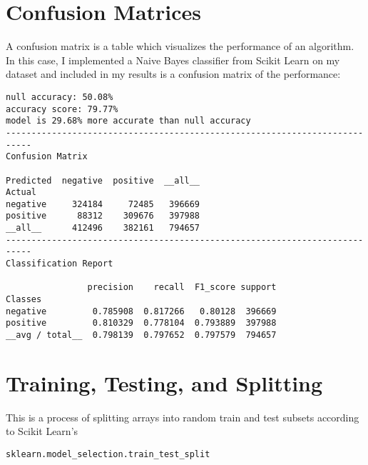 \documentclass[11pt, twoside, reqno]{book}
\begin{document}
\section{Confusion Matrices}
\label{secM3}

A confusion matrix is a table which visualizes the performance of an algorithm. In this case, I implemented a Naive Bayes classifier from Scikit Learn on my dataset and included in my results is a confusion matrix of the performance:
\begin{verbatim}
null accuracy: 50.08%
accuracy score: 79.77%
model is 29.68% more accurate than null accuracy
---------------------------------------------------------------------------
Confusion Matrix

Predicted  negative  positive  __all__
Actual                                
negative     324184     72485   396669
positive      88312    309676   397988
__all__      412496    382161   794657
---------------------------------------------------------------------------
Classification Report

                precision    recall  F1_score support
Classes                                              
negative         0.785908  0.817266   0.80128  396669
positive         0.810329  0.778104  0.793889  397988
__avg / total__  0.798139  0.797652  0.797579  794657
\end{verbatim}

\section{Training, Testing, and Splitting}
\label{secM4}

This is a process of splitting arrays into random train and test subsets according to Scikit Learn's \begin{verbatim}sklearn.model_selection.train_test_split\end{verbatim}
\end{document}
